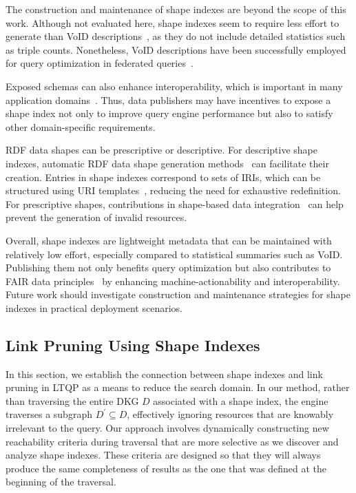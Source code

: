 The construction and maintenance of shape indexes are beyond the scope of this work.
Although not evaluated here, shape indexes seem to require less effort to generate than \ac{VoID} descriptions~\cite{Boehm2011}, as they do not include detailed statistics such as triple counts.
Nonetheless, \ac{VoID} descriptions have been successfully employed for query optimization in federated queries~\cite{Montoya2017}.

Exposed schemas can also enhance interoperability, which is important in many application domains~\cite{rowland2022interoperability, solidSolidApplication, binding2016improving, roller2015benefits}.
Thus, data publishers may have incentives to expose a shape index not only to improve query engine performance but also to satisfy other domain-specific requirements.

\ac{RDF} data shapes can be prescriptive or descriptive.
For descriptive shape indexes, automatic \ac{RDF} data shape generation methods~\cite{fernandez2023extracting} can facilitate their creation.
Entries in shape indexes correspond to sets of \acp{IRI}, which can be structured using \ac{URI} templates~\cite{ietf6570Template}, reducing the need for exhaustive redefinition.
For prescriptive shapes, contributions in shape-based data integration~\cite{LabraGayo2023} can help prevent the generation of invalid resources.

Overall, shape indexes are lightweight metadata that can be maintained with relatively low effort, especially compared to statistical summaries such as \ac{VoID}.
Publishing them not only benefits query optimization but also contributes to \ac{FAIR} data principles~\cite{Wilkinson2016} by enhancing machine-actionability and interoperability.
Future work should investigate construction and maintenance strategies for shape indexes in practical deployment scenarios.

\subsection{Link Pruning Using Shape Indexes}\label{sec:sourceSelection}

In this section, we establish the connection between shape indexes and link pruning in \ac{LTQP} as a means to reduce the search domain.
In our method, rather than traversing the entire \ac{DKG} $D$ associated with a shape index, the engine traverses a subgraph $D^{\prime} \subseteq D$, effectively ignoring resources that are knowably irrelevant to the query.
Our approach involves dynamically constructing new reachability criteria during traversal that are more selective as we discover and analyze shape indexes.
These criteria are designed so that they will always produce the same completeness of results as the one that was defined at the beginning of the traversal.

